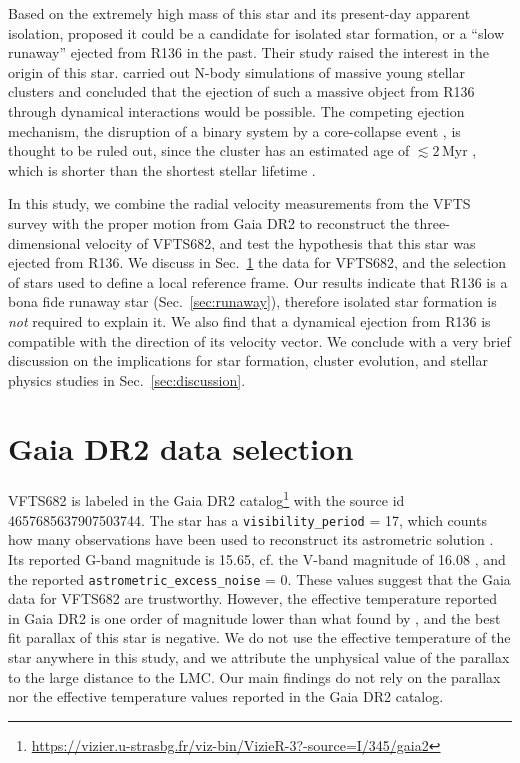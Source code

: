 \documentclass{aa}
\DeclareRobustCommand{\Secref}[1]{Sec.~\ref{#1}}
\begin{document}
Based on the extremely high mass of this star and
its present-day apparent isolation, \cite{bestenlehner:11} proposed it
could be a candidate for isolated star formation, or a ``slow runaway'' ejected
from R136 in the past. Their study raised the interest in the origin
of this star. \cite{fujii:11, banerjee:12} carried out N-body
simulations of massive young stellar clusters and concluded that the
ejection of such a massive object from R136 through dynamical
interactions \citep[e,g,][]{poveda:67} would be possible.
The competing ejection mechanism, the disruption of a binary
system by a core-collapse event \citep[][]{zwicky:57, blaauw:61}, is
thought to be ruled out, since the cluster has an estimated age of
$\lesssim2$\,Myr \citep[][]{crowther:10,sabbi:12}, which is shorter than the shortest stellar lifetime
\citep[$\sim$3\,Myr, e.g.,][]{zapartas:17}.

In this study, we combine the radial velocity measurements from the
VFTS survey \citep[][]{evans:11} with the proper motion from Gaia DR2
to reconstruct the three-dimensional velocity of VFTS682, and test the
hypothesis that this star was ejected from R136. We discuss in
\Secref{sec:sample} the data for VFTS682, and the selection of stars
used to define a local reference frame. Our results
indicate that R136 is a bona fide runaway star (\Secref{sec:runaway}),
therefore isolated star formation is \emph{not}
required to explain it. We also find that a dynamical ejection from
R136 is compatible with the direction of its velocity
vector. 
We conclude
with a very brief discussion on the implications for star formation,
cluster evolution, and stellar physics studies in
\Secref{sec:discussion}.

\section{Gaia DR2 data selection}
\label{sec:sample}

VFTS682 is labeled in the Gaia DR2
catalog\footnote{\url{https://vizier.u-strasbg.fr/viz-bin/VizieR-3?-source=I/345/gaia2}} with the
source id 4657685637907503744. The star has a
\texttt{visibility\_period} = 17, which counts how many observations have
been used to reconstruct its astrometric solution
\citep[][]{lindengren:18}. Its reported G-band
magnitude is 15.65, cf. the V-band magnitude of 16.08
\citep[][]{evans:11, bestenlehner:11}, and the reported
\texttt{astrometric\_excess\_noise} = 0. These values suggest that the Gaia
data for VFTS682 are trustworthy. However, the effective temperature
reported in Gaia DR2 is one order of magnitude lower than what found by
\cite{bestenlehner:11}, and the best fit parallax of this star is
negative. We do not use the effective temperature of the star anywhere
in this study, and we attribute the unphysical value of the parallax
to the large distance to the LMC. Our main findings do not rely on the
parallax nor the effective temperature values reported in the Gaia DR2
catalog.
\end{document}
